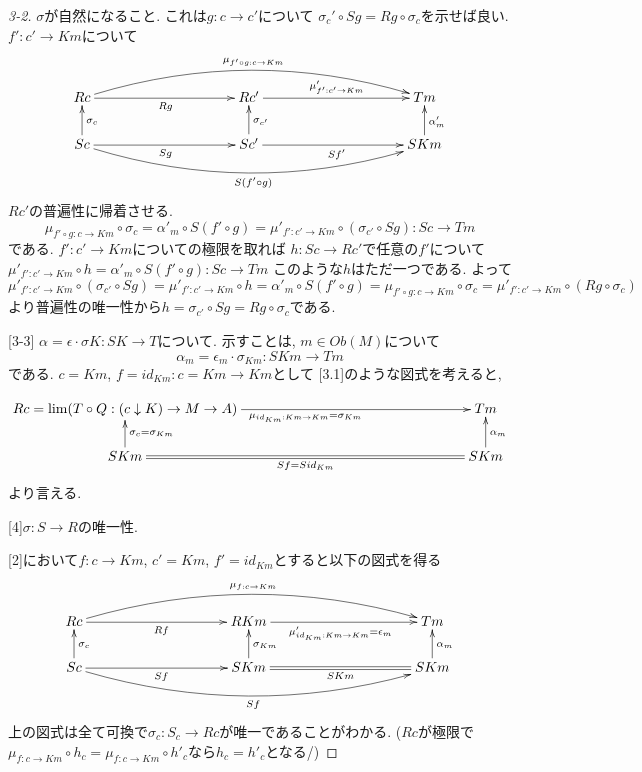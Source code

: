 \documentclass[dvipdfmx,a4paper,11pt]{report}
\theoremstyle{definition}
\begin{document}
\begin{proof}
[3-2] $\sigma$が自然になること.
これは$g : c \to c'$について
$\sigma_c' \circ Sg = Rg \circ\sigma_{c}$を示せば良い.
$f' : c' \to Km$について
\begin{equation*}
\xymatrix@C=100pt@R=20pt{
Rc  \ar@{->}[r]_{Rg}  
\ar@/^20pt/[rr]^{\mu_{f' \circ g : c \to Km}} 
& Rc'  \ar@{->}[r]^{\mu'_{f' : c' \to Km}} 
&Tm  \\
Sc\ar@{->}[r]_{Sg}  \ar@{->}[u]_{\sigma_c}
\ar@/_20pt/[rr]_{S(f' \circ g)} 
& Sc' \ar@{->}[r]_{Sf'} \ar@{->}[u]_{\sigma_{c'}}
&SKm \ar@{->}[u]_{\alpha_m'} \\   
}
\end{equation*}
$Rc'$の普遍性に帰着させる. 
$$
\mu_{f' \circ g : c \to Km}\circ \sigma_c
=
\alpha'_{m} \circ S(f' \circ g)
=
\mu'_{f' : c' \to Km} \circ ( \sigma_{c'}\circ Sg) : Sc \to Tm
$$
である. $f' : c' \to Km$についての極限を取れば
$h : Sc  \to Rc'$で任意の$f'$について
$\mu'_{f' : c' \to Km} \circ h  = \alpha'_{m} \circ S(f' \circ g) : Sc \to Tm$
このような$h$はただ一つである. 
よって
$$
\mu'_{f' : c' \to Km} \circ ( \sigma_{c'}\circ Sg) 
=
\mu'_{f' : c' \to Km} \circ h 
 = \alpha'_{m} \circ S(f' \circ g)
 =\mu_{f' \circ g : c \to Km}\circ \sigma_c
 =
\mu'_{f' : c' \to Km} \circ (Rg \circ \sigma_c)
$$
より普遍性の唯一性から$h = \sigma_{c'}\circ Sg = Rg \circ \sigma_c$である. 

[3-3]  $\alpha = \epsilon \cdot \sigma K : SK \to T$について.
示すことは, $m \in Ob(M)$について
$$
\alpha_{m} = \epsilon_{m} \cdot  \sigma_{Km}:SKm \to Tm
$$
である. 
$c = Km$, $f = id_{Km} : c=Km \to Km$として
[3.1]のような図式を考えると, 

\begin{equation*}
\xymatrix@C=160pt@R=20pt{
Rc = \lim (T \circ Q : (c \downarrow K) \to M \to A) \ar@{->}[r]_{\mu_{id_{Km}: Km \to Km} = \sigma_{Km}}  
& Tm  \\
SKm\ar@{=}[r]_{Sf = Sid_{Km}}  \ar@{->}[u]_{\sigma_c = \sigma_{Km}}
& SKm  \ar@{->}[u]_{\alpha_m}  \\   
}
\end{equation*}
より言える. 

[4]$\sigma : S \to R$の唯一性. 

[2]において$f : c \to Km$, $c' =Km$, $f' = id_{Km}$とすると以下の図式を得る
\begin{equation*}
\xymatrix@C=100pt@R=20pt{
Rc  \ar@{->}[r]_{Rf}  
\ar@/^20pt/[rr]^{\mu_{ f : c \to Km}} 
& RKm  \ar@{->}[r]_{\mu'_{id_{Km} : Km \to Km} = \epsilon_{m}} 
&Tm  \\
Sc\ar@{->}[r]_{Sf}  \ar@{->}[u]_{\sigma_c}
\ar@/_20pt/[rr]_{Sf} 
& SKm \ar@{=}[r]_{SKm} \ar@{->}[u]_{\sigma_{Km}}
&SKm \ar@{->}[u]_{\alpha_m} \\   
}
\end{equation*}
上の図式は全て可換で$\sigma_c: S_c \to Rc$が唯一であることがわかる.
($Rc$が極限で$\mu_{ f : c \to Km} \circ h_c =\mu_{ f : c \to Km}\circ  h'_c$なら$h_c = h'_c$となる/)
\end{proof}
\end{document}
